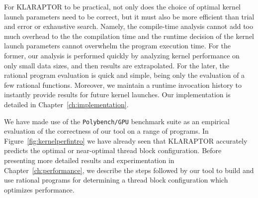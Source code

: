 For KLARAPTOR to be practical, not only does the choice of optimal
kernel launch parameters need to be correct, but it must also
be more efficient than trial and error or exhaustive search.
Namely, the compile-time analysis cannot add too much 
overhead to the the compilation time and the
runtime decision of the kernel launch parameters cannot
overwhelm the program execution time. 
For the former, our analysis is performed
quickly by analyzing kernel performance on only small data sizes, 
and then results are extrapolated.
For the later, the rational program evaluation is quick and simple, 
being only the evaluation of a few rational functions.
Moreover, we maintain a runtime invocation history
to instantly provide results for future kernel launches.
Our implementation is detailed in Chapter~\ref{ch:implementation}.

We have made use of the \texttt{Polybench/GPU}
benchmark suite as an empirical
evaluation of the correctness of our tool on a range of {\cuda} programs.
In Figure~\ref{fig:kernelperfintro} we have already seen that KLARAPTOR
accurately predicts the optimal or near-optimal thread block
configuration. 
Before presenting more detailed results and 
experimentation in Chapter~\ref{ch:performance},
we describe the steps followed by our tool
to build and use rational programs for 
determining a thread block configuration which optimizes
performance.





